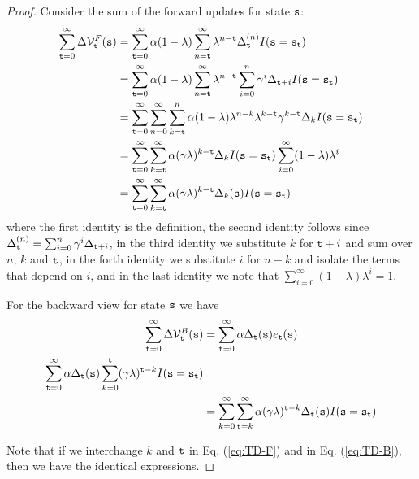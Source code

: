 \begin{proof}
Consider the sum of the forward updates for state ${\tt s}$:
\begin{align}
\sum_{\ttime=0}^{\infty } \Delta \Value^F_\ttime (\state)&=
\sum_{\ttime=0}^{\infty} \alpha
(1-\lambda) \sum_{n=\ttime}^{\infty} \lambda^{n-\ttime}\Delta_\ttime^{(n)} I(\state=\state_\ttime)\nonumber\\
%
&= \sum_{\ttime=0}^{\infty}  \alpha
(1-\lambda) \sum_{n=\ttime}^{\infty} \lambda^{n-\ttime}\sum_{i=0}^n \discount^i \Delta_{\ttime+i} I(\state=\state_\ttime)\nonumber\\
%
&=\sum_{\ttime=0}^\infty \sum_{n=0}^\infty \sum_{k=\ttime}^n \alpha
(1-\lambda)
\lambda^{n-k}\lambda^{k-\ttime}\discount^{k-\ttime}\Delta_k I(\state=\state_\ttime)\nonumber\\
%
&=\sum_{\ttime=0}^\infty \sum_{k=\ttime}^\infty \alpha
(\discount\lambda)^{k-\ttime}\Delta_k I(\state=\state_\ttime) \sum_{i=0}^\infty (1-\lambda)\lambda^{i}\nonumber\\
%
&= \sum_{\ttime=0}^\infty \sum_{k=\ttime}^\infty \alpha
(\discount\lambda)^{k-\ttime} \Delta_k(\state)
I(\state=\state_\ttime) \label{eq:TD-F}
\end{align}
where the first identity is the definition, the second identity
follows since $\Delta_{\tt t}^{(n)}=\sum_{i=0}^n\gamma^i
\Delta_{{\tt t}+i}$, in the third identity we substitute $k$ for
${\tt t}+i$ and sum over $n$, $k$ and ${\tt t}$, in the forth identity we
substitute $i$ for $n-k$ and isolate the terms that depend on $i$,
and in the last identity we note that $\sum_{i=0}^\infty
(1-\lambda)\lambda^{i}=1$.

For the backward view for state ${\tt s}$ we have
\begin{align}
\sum_{{\tt t}=0}^{\infty } \Delta \mathcal{V}^B_{\tt t} ({\tt s})&=\sum_{{\tt t}=0}^{\infty} \alpha
\Delta_{\tt t}({\tt s}) e_{{\tt t}}({\tt s})\\
\sum_{{\tt t}=0}^{\infty} \alpha
\Delta_{\tt t}({\tt s}) \sum_{k=0}^{\tt t} (\gamma\lambda)^{{\tt t}-k} I({\tt s}={\tt s}_{\tt t})\nonumber\\
&= \sum_{k=0}^\infty \sum_{{\tt t}=k}^\infty \alpha
(\gamma\lambda)^{{\tt t}-k}\Delta_{\tt t}({\tt s})I({\tt s}={\tt s}_{\tt t})
\label{eq:TD-B}
\end{align}

Note that if we interchange $k$ and ${\tt t}$ in Eq. (\ref{eq:TD-F})
and in Eq. (\ref{eq:TD-B}), then we have the identical expressions.
\end{proof}

